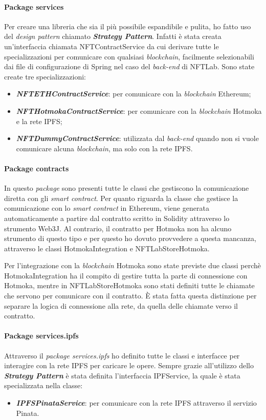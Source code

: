\paragraph{Package services} Per creare una libreria che sia il più possibile espandibile e pulita, ho fatto uso del \textit{design pattern} chiamato \textit{\textbf{Strategy Pattern}}. Infatti è stata creata un'interfaccia chiamata NFTContractService da cui derivare tutte le specializzazioni per comunicare con qualsiasi \textit{blockchain}, facilmente selezionabili dai file di configurazione di Spring nel caso del \textit{back-end} di NFTLab. Sono state create tre specializzazioni:
\begin{itemize}
  \item \textit{\textbf{NFTETHContractService}}: per comunicare con la \textit{blockchain} Ethereum;
  \item \textit{\textbf{NFTHotmokaContractService}}: per comunicare con la \textit{blockchain} Hotmoka e la rete IPFS;
  \item \textit{\textbf{NFTDummyContractService}}: utilizzata dal \textit{back-end} quando non si vuole comunicare alcuna \textit{blockchain}, ma solo con la rete IPFS.
\end{itemize}

\paragraph{Package contracts} In questo \textit{package} sono presenti tutte le classi che gestiscono la comunicazione diretta con gli \textit{smart contract}. Per quanto riguarda la classe che gestisce la comunicazione con lo \textit{smart contract} in Ethereum, viene generata automaticamente a partire dal contratto scritto in Solidity attraverso lo strumento Web3J. Al contrario, il contratto per Hotmoka non ha alcuno strumento di questo tipo e per questo ho dovuto provvedere a questa mancanza, attraverso le classi HotmokaIntegration e NFTLabStoreHotmoka.

Per l'integrazione con la \textit{blockchain} Hotmoka sono state previste due classi perchè HotmokaIntegration ha il compito di gestire tutta la parte di connessione con Hotmoka, mentre in NFTLabStoreHotmoka sono stati definiti tutte le chiamate che servono per comunicare con il contratto. È stata fatta questa distinzione per separare la logica di connessione alla rete, da quella delle chiamate verso il contratto.

\paragraph{Package services.ipfs} Attraverso il \textit{package services.ipfs} ho definito tutte le classi e interfacce per interagire con la rete IPFS per caricare le opere. Sempre grazie all'utilizzo dello \textit{\textbf{Strategy Pattern}} è stata definita l'interfaccia IPFService, la quale è stata specializzata nella classe:
\begin{itemize}
  \item \textbf{\textit{IPFSPinataService}}: per comunicare con la rete IPFS attraverso il servizio Pinata.
\end{itemize}

